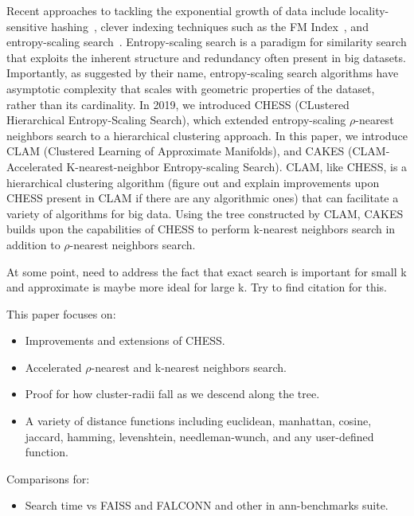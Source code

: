 Recent approaches to tackling the exponential growth of data include locality-sensitive hashing~\cite{bingham2001random}, 
clever indexing techniques such as the FM Index~\cite{ferragina2005indexing}, and entropy-scaling search~\cite{yu2015entropy, ishaq2019clustered}. 
Entropy-scaling search is a paradigm for similarity search that exploits the inherent structure and redundancy often present in big datasets.
Importantly, as suggested by their name, entropy-scaling search algorithms have asymptotic complexity that scales with geometric properties of the dataset,
rather than its cardinality. In 2019, we introduced CHESS (CLustered Hierarchical Entropy-Scaling Search), which extended entropy-scaling $\rho$-nearest 
neighbors search to a hierarchical clustering approach. In this paper, we introduce CLAM (Clustered Learning of Approximate Manifolds), and CAKES (CLAM-Accelerated K-nearest-neighbor 
Entropy-scaling Search). CLAM, like CHESS, is a hierarchical clustering algorithm (figure out and explain improvements upon CHESS present in CLAM if there are any algorithmic ones)
that can facilitate a variety of algorithms for big data. Using the tree constructed by CLAM, CAKES builds upon the capabilities of CHESS to perform 
k-nearest neighbors search in addition to $\rho$-nearest neighbors search.


At some point, need to address the fact that exact search is important for small k and approximate 
is maybe more ideal for large k. Try to find citation for this. 

This paper focuses on:
\begin{itemize}
    \item Improvements and extensions of CHESS.
    \item Accelerated $\rho$-nearest and k-nearest neighbors search.
    \item Proof for how cluster-radii fall as we descend along the tree.
    \item A variety of distance functions including euclidean, manhattan, cosine, jaccard, hamming, levenshtein, needleman-wunch, and any user-defined function.
\end{itemize}

Comparisons for:
\begin{itemize}
    \item Search time vs FAISS and FALCONN and other in ann-benchmarks suite.
\end{itemize}
